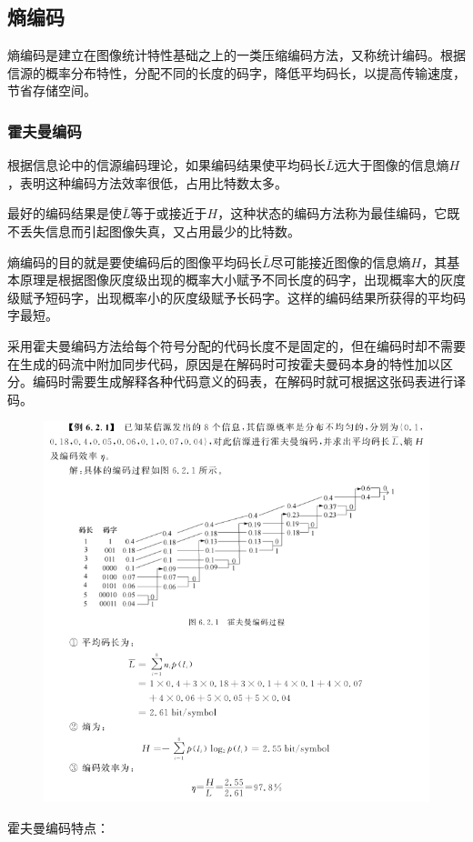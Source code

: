 \documentclass[11pt]{article}
\begin{document}
\subsection{熵编码}
熵编码是建立在图像统计特性基础之上的一类压缩编码方法，又称统计编码。根据信源的概率分布特性，分配不同的长度的码字，降低平均码长，以提高传输速度，节省存储空间。
\subsubsection{霍夫曼编码}
根据信息论中的信源编码理论，如果编码结果使平均码长$\bar{L}$远大于图像的信息熵$H$，表明这种编码方法效率很低，占用比特数太多。

最好的编码结果是使$\bar{L}$等于或接近于$H$，这种状态的编码方法称为最佳编码，它既不丢失信息而引起图像失真，又占用最少的比特数。

熵编码的目的就是要使编码后的图像平均码长$\bar{L}$尽可能接近图像的信息熵$H$，其基本原理是根据图像灰度级出现的概率大小赋予不同长度的码字，出现概率大的灰度级赋予短码字，出现概率小的灰度级赋予长码字。这样的编码结果所获得的平均码字最短。

采用霍夫曼编码方法给每个符号分配的代码长度不是固定的，但在编码时却不需要在生成的码流中附加同步代码，原因是在解码时可按霍夫曼码本身的特性加以区分。编码时需要生成解释各种代码意义的码表，在解码时就可根据这张码表进行译码。

\begin{figure}[H]
	\centering
	\includegraphics[scale=0.6]{38}
\end{figure}
霍夫曼编码特点：
\end{document}
